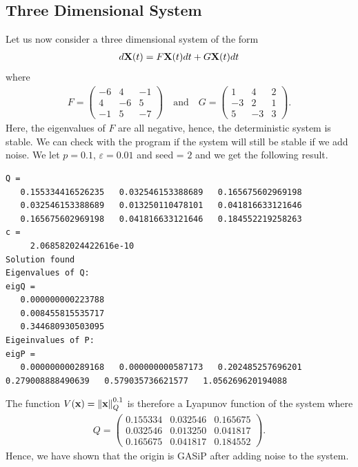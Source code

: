 \documentclass[a4paper,12pt,twoside,BCOR=10mm]{scrbook}
\begin{document}
\subsection{Three Dimensional System}
Let us now consider a three dimensional system of the form
\begin{align*}
    d\mathbf{X}(t) = F\mathbf{X}(t)dt + G\mathbf{X}(t)dt
\end{align*}
where
\begin{align*}
    F = \begin{pmatrix}
    -6 & 4 & -1\\
    4 & -6 & 5\\
    -1 & 5 & -7
    \end{pmatrix}
    \quad \text{and} \quad
    G = \begin{pmatrix}
    1 & 4 & 2\\
    -3 & 2 & 1\\
    5 & -3 & 3
    \end{pmatrix}.
\end{align*}
Here, the eigenvalues of $F$ are all negative, hence, the deterministic system is stable. We can check with the program if the system will still be stable if we add noise. We let $p = 0.1$, $\varepsilon = 0.01$ and seed = $2$ and we get the following result.
\begin{lstlisting}
Q =
   0.155334416526235   0.032546153388689   0.165675602969198
   0.032546153388689   0.013250110478101   0.041816633121646
   0.165675602969198   0.041816633121646   0.184552219258263
c =
     2.068582024422616e-10
Solution found
Eigenvalues of Q:
eigQ =
   0.000000000223788
   0.008455815535717
   0.344680930503095
Eigeinvalues of P:
eigP =
   0.000000000289168   0.000000000587173   0.202485257696201   0.279008888490639   0.579035736621577   1.056269620194088
\end{lstlisting}
The function $V(\mathbf{x}) = \left\lVert\mathbf{x}\right\rVert_{Q}^{0.1}$ is therefore a Lyapunov function of the system where
\begin{align*}
    Q = \begin{pmatrix}
    0.155334 & 0.032546 & 0.165675\\
    0.032546 & 0.013250 & 0.041817\\
    0.165675 & 0.041817 & 0.184552
    \end{pmatrix}.
\end{align*}
Hence, we have shown that the origin is GASiP after adding noise to the system.
\end{document}
